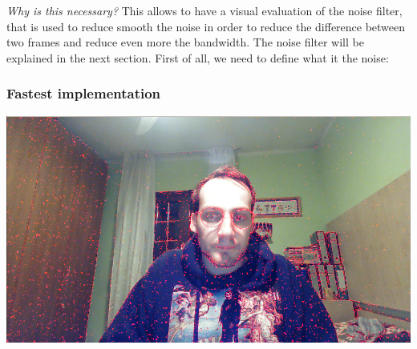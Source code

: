 \documentclass[paper=a4, fontsize=10pt]{scrartcl}	%
\begin{document}
	\textit{Why is this necessary?} This allows to have a visual evaluation of the noise filter, that is used to reduce smooth the noise in order to reduce the difference between two frames and reduce even more the bandwidth. The noise filter will be explained in the next section.\newline\newline
	First of all, we need to define what it the noise:
	
	\subsubsection{Fastest implementation}
	\begin{center}
		\includegraphics[width=0.4\linewidth]{images/heatmap/gpu_red_2}
	\end{center}
	
\end{document}
